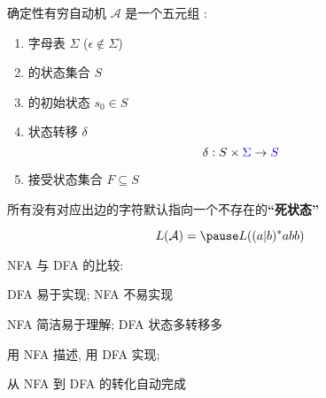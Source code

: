 \begin{frame}{}
  \begin{definition}
    确定性有穷自动机 $\mathcal{A}$ 是一个五元组 
    :

    \vspace{0.30cm}
    \begin{enumerate}[(1)]
      \item 字母表 $\Sigma$ ($\epsilon \notin \Sigma$)
      \item {}的状态集合 $S$
      \item {}的初始状态 $s_{0} \in S$
      \item 状态转移 $\delta$
        \[
          \delta: S \times \textcolor{blue}{\Sigma} \to \textcolor{blue}{S}
        \]
      \item 接受状态集合 $F \subseteq S$
    \end{enumerate}
  \end{definition}


  \pause
  \begin{center}
     所有没有对应出边的字符默认指向一个不存在的{\bf ``死状态''}
  \end{center}
\end{frame}

\begin{frame}{}

  \[
    L(\mathcal{A}) = \pause L((a|b)^{\ast}abb)
  \]

  \pause
\end{frame}

\begin{frame}{}
  \begin{center}
    NFA 与 DFA 的比较:

    \vspace{0.80cm}
    DFA 易于实现; NFA 不易实现

    \vspace{0.30cm}
    NFA 简洁易于理解; DFA 状态多转移多

    \vspace{0.80cm}

    \vspace{0.30cm}
    用 NFA 描述, 用 DFA 实现; 

    \vspace{0.30cm}
    从 NFA 到 DFA 的转化自动完成
  \end{center}
\end{frame}

